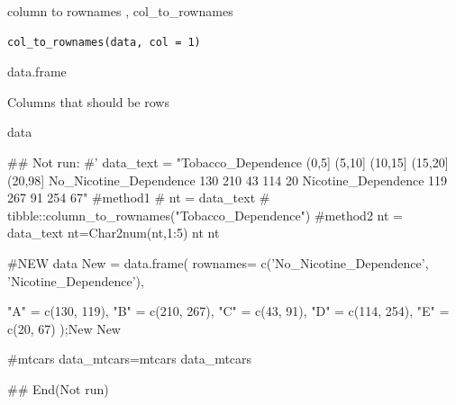 \documentclass[a4paper]{book}
\begin{document}
%
\begin{Description}
column to rownames , col\_to\_rownames
\end{Description}
%
\begin{Usage}
\begin{verbatim}
col_to_rownames(data, col = 1)
\end{verbatim}
\end{Usage}
%
\begin{Arguments}
\begin{ldescription}
\item[\code{data}] data.frame

\item[\code{col}] Columns that should be rows
\end{ldescription}
\end{Arguments}
%
\begin{Value}
data
\end{Value}
%
\begin{Examples}
\begin{ExampleCode}

\#\# Not run: 
#'
data_text = "Tobacco_Dependence (0,5] (5,10] (10,15] (15,20] (20,98]
No_Nicotine_Dependence 130 210 43 114 20
Nicotine_Dependence 119 267 91 254 67"
#method1
# nt = data_text%
#         tibble::column_to_rownames("Tobacco_Dependence")
#method2
nt = data_text%
nt=Char2num(nt,1:5)
nt
nt %

#NEW data
New = data.frame(
  rownames= c('No_Nicotine_Dependence', 'Nicotine_Dependence'),

  "A" = c(130, 119),
  "B" = c(210, 267),
  "C" = c(43, 91),
  "D" = c(114, 254),
  "E" = c(20, 67)
);New
New%

#mtcars
data_mtcars=mtcars%
data_mtcars%




## End(Not run)


\end{ExampleCode}
\end{Examples}
\end{document}
